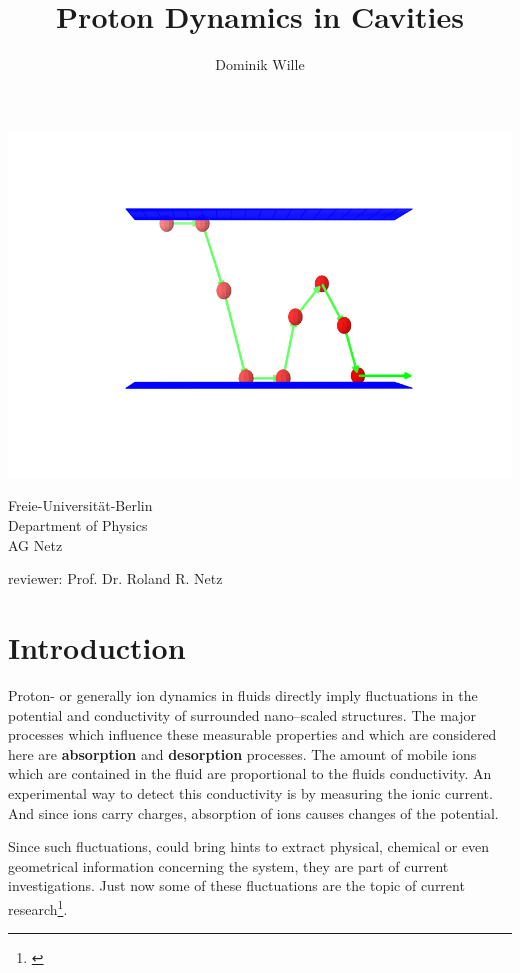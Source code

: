 \documentclass[a4paper, parskip=half]{scrartcl}
\title{Proton Dynamics in Cavities}
\author{Dominik Wille}
\newcommand{\effect}[1]{%
	\textbf{#1}%
}
\newcommand{\myCite}[1]{\footnote{\cite{#1} \citeauthor{#1} \citetitle{#1} \citeyear{#1}}}
\begin{document}
\maketitle

\includegraphics[width=\textwidth]{img/title}

\vfill

\enlargethispage{2cm}
  \parbox[t]{0.45\textwidth}{%
   Freie-Universität-Berlin\\
   Department of Physics\\
   AG Netz
  }
  \parbox[t]{0.55\textwidth}{\raggedleft%
     reviewer: Prof. Dr. Roland R. Netz
  }

\thispagestyle{empty}
\newpage
\tableofcontents
\thispagestyle{empty}
\newpage

\section{Introduction}
Proton- or generally ion dynamics in fluids directly imply fluctuations in the potential and conductivity of surrounded nano--scaled structures. The major processes which influence these measurable properties and which are considered here are \effect{absorption} and \effect{desorption} processes. The amount of mobile ions which are contained in the fluid are proportional to the fluids conductivity. An experimental way to detect this conductivity is by measuring the ionic current. And since ions carry charges, absorption of ions causes changes of the potential.

Since such fluctuations, could bring hints to extract physical, chemical or even geometrical information concerning the system, they are part of current investigations. Just now some of these fluctuations are the topic of current research\myCite{pinknoise}. 
\end{document}
